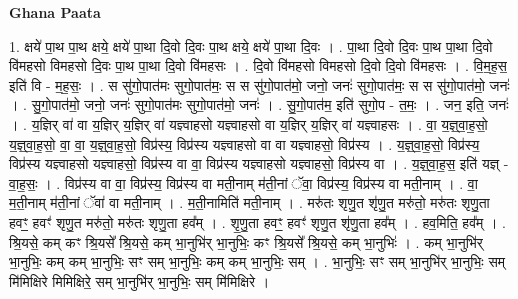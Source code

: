 \documentclass[17pt]{extarticle}
\begin{document}
\textbf{Ghana Paata } \newline

1. क्षये॑ पा॒थ पा॒थ क्षये॒ क्षये॑ पा॒था दि॒वो दि॒वः पा॒थ क्षये॒ क्षये॑ पा॒था दि॒वः । . पा॒था दि॒वो दि॒वः पा॒थ पा॒था दि॒वो वि॑महसो विमहसो दि॒वः पा॒थ पा॒था दि॒वो वि॑महसः । . दि॒वो वि॑महसो विमहसो दि॒वो दि॒वो वि॑महसः । . वि॒म॒ह॒स॒ इति॑ वि - म॒ह॒सः॒ । . स सु॑गो॒पात॑मः सुगो॒पात॑मः॒ स स सु॑गो॒पात॑मो॒ जनो॒ जनः॑ सुगो॒पात॑मः॒ स स सु॑गो॒पात॑मो॒ जनः॑ । . सु॒गो॒पात॑मो॒ जनो॒ जनः॑ सुगो॒पात॑मः सुगो॒पात॑मो॒ जनः॑ । . सु॒गो॒पात॑म॒ इति॑ सुगो॒प - त॒मः॒ । . जन॒ इति॒ जनः॑ । . य॒ज्ञिर् वा॑ वा य॒ज्ञिर् य॒ज्ञिर् वा॑ यज्ञ्वाहसो यज्ञ्वाहसो वा य॒ज्ञिर् य॒ज्ञिर् वा॑ यज्ञ्वाहसः । . वा॒ य॒ज्ञ्॒वा॒ह॒सो॒ य॒ज्ञ्॒वा॒ह॒सो॒ वा॒ वा॒ य॒ज्ञ्॒वा॒ह॒सो॒ विप्र॑स्य॒ विप्र॑स्य यज्ञ्वाहसो वा वा यज्ञ्वाहसो॒ विप्र॑स्य । . य॒ज्ञ्॒वा॒ह॒सो॒ विप्र॑स्य॒ विप्र॑स्य यज्ञ्वाहसो यज्ञ्वाहसो॒ विप्र॑स्य वा वा॒ विप्र॑स्य यज्ञ्वाहसो यज्ञ्वाहसो॒ विप्र॑स्य वा । . य॒ज्ञ्॒वा॒ह॒स॒ इति॑ यज्ञ् - वा॒ह॒सः॒ । . विप्र॑स्य वा वा॒ विप्र॑स्य॒ विप्र॑स्य वा मती॒नाम् म॑ती॒नां ॅवा॒ विप्र॑स्य॒ विप्र॑स्य वा मती॒नाम् । . वा॒ म॒ती॒नाम् म॑ती॒नां ॅवा॑ वा मती॒नाम् । . म॒ती॒नामिति॑ मती॒नाम् । . मरु॑तः शृणु॒त शृ॑णु॒त मरु॑तो॒ मरु॑तः शृणु॒ता हवꣳ॒॒ हवꣳ॑ शृणु॒त मरु॑तो॒ मरु॑तः शृणु॒ता हव᳚म् । . शृ॒णु॒ता हवꣳ॒॒ हवꣳ॑ शृणु॒त शृ॑णु॒ता हव᳚म् । . हव॒मिति॒ हव᳚म् । . श्रि॒यसे॒ कम् कꣳ श्रि॒यसे᳚ श्रि॒यसे॒ कम् भा॒नुभि॑र् भा॒नुभिः॒ कꣳ श्रि॒यसे᳚ श्रि॒यसे॒ कम् भा॒नुभिः॑ । . कम् भा॒नुभि॑र् भा॒नुभिः॒ कम् कम् भा॒नुभिः॒ सꣳ सम् भा॒नुभिः॒ कम् कम् भा॒नुभिः॒ सम् । . भा॒नुभिः॒ सꣳ सम् भा॒नुभि॑र् भा॒नुभिः॒ सम् मि॑मिक्षिरे मिमिक्षिरे॒ सम् भा॒नुभि॑र् भा॒नुभिः॒ सम् मि॑मिक्षिरे । \newline
\end{document}
